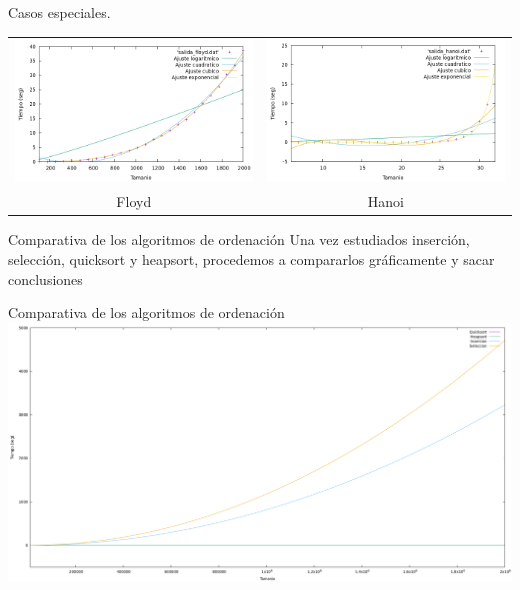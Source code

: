 \documentclass[10pt, xcolor=table]{beamer}
\begin{document}
\begin{frame}[fragile]{Casos especiales.
}
\centering
\begin{tabular}{cc}
\includegraphics[scale=0.23]{../../Images/floy_comparacion.png}
&
\includegraphics[scale=0.23]{../../Images/hanoi_comparacion.png}
\\
Floyd & Hanoi
\end{tabular}
\end{frame}


\begin{frame}{Comparativa de los algoritmos de ordenación}
Una vez estudiados inserción, selección, quicksort y heapsort, procedemos a compararlos gráficamente y sacar conclusiones
\end{frame}

\begin{frame}[fragile]{Comparativa de los algoritmos de ordenación}
\centering
\includegraphics[scale=0.15]{../../Images/Gráfica comparativa algoritmos de ordenación Joshoccas.png}
\end{frame}
\end{document}
